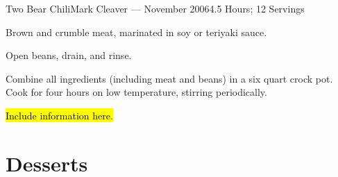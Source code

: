 \documentclass{article}
\begin{document}
\begin{recipe}{Two Bear Chili}{Mark Cleaver --- November 2006}{4.5 Hours; 12 Servings}

   Brown and crumble meat, marinated in soy or teriyaki sauce.

   Open beans, drain, and rinse.  

   Combine all ingredients (including meat and beans) in a six quart crock pot.
   Cook for four hours on low temperature, stirring periodically.  


   \freeform
   \hl{Include information here.}

\end{recipe}


\section{Desserts}
\end{document}
